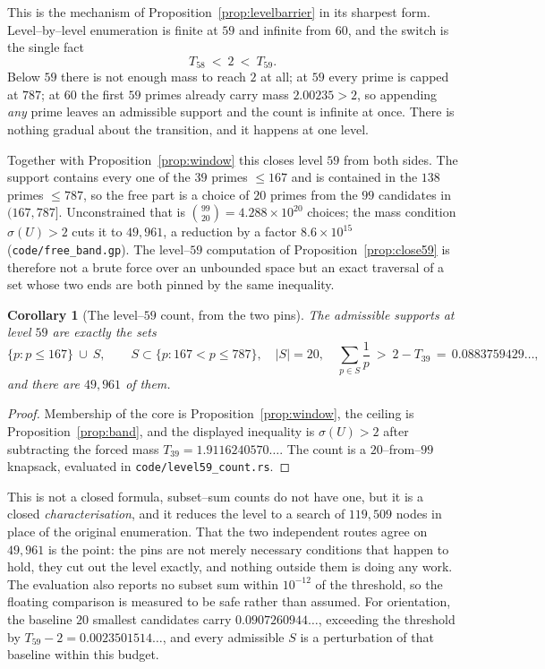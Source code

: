 \documentclass[11pt]{article}
\newtheorem{corollary}[theorem]{Corollary}
\theoremstyle{definition}
\begin{document}
This is the mechanism of Proposition~\ref{prop:levelbarrier} in its sharpest form. Level--by--level
enumeration is finite at $59$ and infinite from $60$, and the switch is the single fact
\[ T_{58}\ <\ 2\ <\ T_{59}. \]
Below $59$ there is not enough mass to reach $2$ at all; at $59$ every prime is capped at $787$; at
$60$ the first $59$ primes already carry mass $2.00235>2$, so appending \emph{any} prime leaves an
admissible support and the count is infinite at once. There is nothing gradual about the transition,
and it happens at one level.

Together with Proposition~\ref{prop:window} this closes level $59$ from both sides. The support
contains every one of the $39$ primes $\le167$ and is contained in the $138$ primes $\le787$, so the
free part is a choice of $20$ primes from the $99$ candidates in $(167,787]$. Unconstrained that is
$\binom{99}{20}=4.288\times10^{20}$ choices; the mass condition $\sigma(U)>2$ cuts it to $49{,}961$,
a reduction by a factor $8.6\times10^{15}$ \textup{(\texttt{code/free\_band.gp})}. The level--$59$
computation of Proposition~\ref{prop:close59} is therefore not a brute force over an unbounded space
but an exact traversal of a set whose two ends are both pinned by the same inequality.

\begin{corollary}[The level--$59$ count, from the two pins]\label{cor:count59}
The admissible supports at level $59$ are exactly the sets
\[ \{p:p\le167\}\ \cup\ S, \qquad S\subset\{p:167<p\le787\},\quad |S|=20,\quad
   \sum_{p\in S}\frac1p\ >\ 2-T_{39}\,=\,0.0883759429\ldots, \]
and there are $49{,}961$ of them.
\end{corollary}
\begin{proof}
Membership of the core is Proposition~\ref{prop:window}, the ceiling is Proposition~\ref{prop:band},
and the displayed inequality is $\sigma(U)>2$ after subtracting the forced mass
$T_{39}=1.9116240570\ldots$. The count is a $20$--from--$99$ knapsack, evaluated in
\texttt{code/level59\_count.rs}.
\end{proof}

This is not a closed formula, subset--sum counts do not have one, but it is a closed
\emph{characterisation}, and it reduces the level to a search of $119{,}509$ nodes in place of the
original enumeration. That the two independent routes agree on $49{,}961$ is the point: the pins are
not merely necessary conditions that happen to hold, they cut out the level exactly, and nothing
outside them is doing any work. The evaluation also reports no subset sum within $10^{-12}$ of the
threshold, so the floating comparison is measured to be safe rather than assumed. For orientation,
the baseline $20$ smallest candidates carry $0.0907260944\ldots$, exceeding the threshold by
$T_{59}-2=0.0023501514\ldots$, and every admissible $S$ is a perturbation of that baseline within
this budget.
\end{document}
